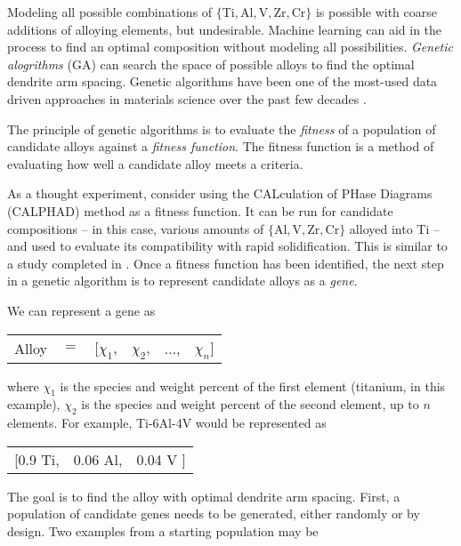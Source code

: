 Modeling all possible combinations of $\{\text{Ti},\text{Al}, \text{V}, \text{Zr}, \text{Cr}\}$ is possible with coarse additions of alloying elements, but undesirable. Machine learning can aid in the process to find an optimal composition without modeling all possibilities. \textit{Genetic alogrithms} (GA) can search the space of possible alloys to find the optimal dendrite arm spacing. Genetic algorithms have been one of the most-used data driven approaches in materials science over the past few decades \cite{Morris1996, Ho1998, Wolf2000, Johannesson2002, Stucke2003, Hart2005, Oganov2006}.

The principle of genetic algorithms is to evaluate the \textit{fitness} of a population of candidate alloys against a \textit{fitness function}. The fitness function is a method of evaluating how well a candidate alloy meets a criteria.

As a thought experiment, consider using the CALculation of PHase Diagrams (CALPHAD) method as a fitness function. It can be run for candidate compositions -- in this case, various amounts of $\{\text{Al}, \text{V}, \text{Zr}, \text{Cr}\}$ alloyed into Ti -- and used to evaluate its compatibility with rapid solidification. This is similar to a study completed in \cite{Li2017}. Once a fitness function has been identified, the next step in a genetic algorithm is to represent candidate alloys as a \textit{gene}. 

We can represent a gene as 

\begin{table}[h!]
\begin{tabular}{cccccc}
	Alloy & $=$ & [$\chi_1$, & $\chi_2$, & $\ldots$, & $\chi_n$] \\
\end{tabular}
\end{table}
where $\chi_1$ is the species and weight percent of the first element (titanium, in this example), $\chi_2$ is the species and weight percent of the second element, up to $n$ elements. For example, Ti-6Al-4V would be represented as

\begin{table}[h!]
\begin{tabular}{ccc}
	 [0.9 Ti,  & 0.06 Al, & 0.04 V ] \\
\end{tabular}
\end{table}
The goal is to find the alloy with optimal dendrite arm spacing. First, a population of candidate genes needs to be generated, either randomly or by design. Two examples from a starting population may be

